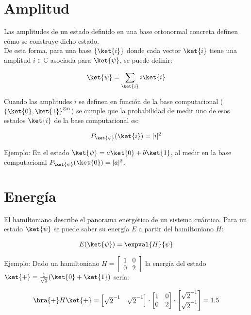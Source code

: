 \section{Amplitud}

Las amplitudes de un estado definido en una base ortonormal concreta definen cómo se construye dicho estado.
\\
De esta forma, para una base $\{\ket{i}\}$ donde cada vector $\ket{i}$ tiene una amplitud $i \in \mathbb{C}$ asociada para $\ket{\psi}$, se puede definir:

\begin{align}
  \ket{\psi} = \sum_{\ket{i}} i \ket{i}
\end{align}

Cuando las amplitudes $i$ se definen en función de la base computacional (${\{\ket{0}, \ket{1}\}}^{\otimes n}$) se cumple que la probabilidad de medir uno de esos estados $\ket{i}$ de la base computacional es:

\begin{align}
  P_{\ket{\psi}}(\ket{i}) = |i|^2
\end{align}

Ejemplo: En el estado $\ket{\psi} = a\ket{0} + b\ket{1}$, al medir en la base computacional $P_{\ket{\psi}}(\ket{0}) = |a|^2$.

\section{Energía\label{sec:8-concepto-energia}}

El hamiltoniano describe el panorama energético de un sistema cuántico.
Para un estado $\ket{\psi}$ se puede saber su energía $E$ a partir del hamiltoniano $H$:

\begin{align}
  E(\ket{\psi}) = \expval{H}{\psi}
\end{align}

Ejemplo: Dado un hamiltoniano $H = \begin{bmatrix} 1 & 0 \\ 0 & 2 \end{bmatrix}$ la energía del estado $\ket{+} = \frac{1}{\sqrt{2}} (\ket{0} + \ket{1})$ sería:

\begin{align}
  \bra{+}H\ket{+} = \begin{bmatrix} \sqrt{2}^{-1} & \sqrt{2}^{-1}\end{bmatrix} \cdot
  \begin{bmatrix}
    1 & 0 \\
    0 & 2
  \end{bmatrix} \cdot \begin{bmatrix} \sqrt{2}^{-1} \\ \sqrt{2}^{-1}\end{bmatrix} = 1.5
\end{align}



